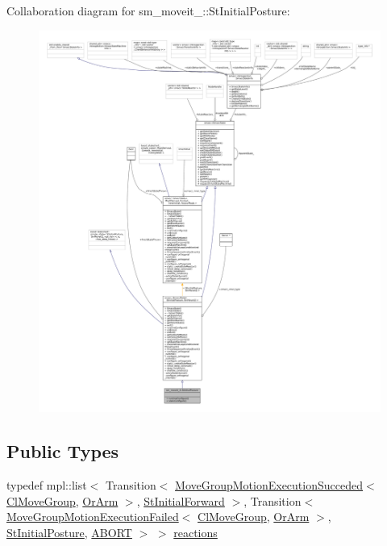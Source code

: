 Collaboration diagram for sm\+\_\+moveit\+\_\+:\+:St\+Initial\+Posture\+:
\nopagebreak
\begin{figure}[H]
\begin{center}
\leavevmode
\includegraphics[width=350pt]{structsm__moveit__2_1_1StInitialPosture__coll__graph}
\end{center}
\end{figure}
\subsection*{Public Types}
\begin{DoxyCompactItemize}
\item 
typedef mpl\+::list$<$ Transition$<$ \hyperlink{structmove__group__interface__client_1_1MoveGroupMotionExecutionSucceded}{Move\+Group\+Motion\+Execution\+Succeded}$<$ \hyperlink{classmove__group__interface__client_1_1ClMoveGroup}{Cl\+Move\+Group}, \hyperlink{classsm__moveit__2_1_1OrArm}{Or\+Arm} $>$, \hyperlink{structsm__moveit__2_1_1StInitialForward}{St\+Initial\+Forward} $>$, Transition$<$ \hyperlink{structmove__group__interface__client_1_1MoveGroupMotionExecutionFailed}{Move\+Group\+Motion\+Execution\+Failed}$<$ \hyperlink{classmove__group__interface__client_1_1ClMoveGroup}{Cl\+Move\+Group}, \hyperlink{classsm__moveit__2_1_1OrArm}{Or\+Arm} $>$, \hyperlink{structsm__moveit__2_1_1StInitialPosture}{St\+Initial\+Posture}, \hyperlink{classABORT}{A\+B\+O\+RT} $>$ $>$ \hyperlink{structsm__moveit__2_1_1StInitialPosture_a63b7efb582df2d3a6e8cf2a4d11f5303}{reactions}
\end{DoxyCompactItemize}
